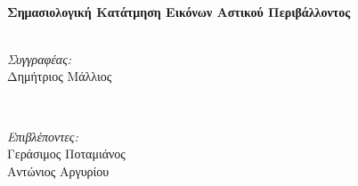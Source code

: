\begin{titlepage}

\HRule \\[0.4cm]
{ \huge \bfseries \textgreek{Σημασιολογική Κατάτμηση Εικόνων Αστικού Περιβάλλοντος}}\\[0.4cm] %
\HRule \\[1.5cm]
 

\begin{minipage}{0.4\textwidth}
\begin{flushleft} \large
\emph{\textgreek{Συγγραφέας}:}\\
\textgreek{Δημήτριος Μάλλιος} %
\end{flushleft}
\end{minipage}
~
\begin{minipage}{0.4\textwidth}
\begin{flushright} \large
\emph{\textgreek{Επιβλέποντες}:} \\
\textgreek{Γεράσιμος Ποταμιάνος\\
Αντώνιος Αργυρίου}

\end{flushright}
\end{minipage}\\[4cm]






\end{titlepage}
